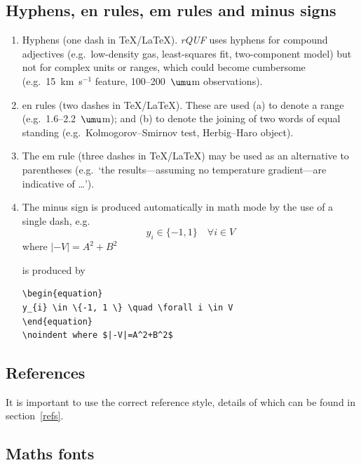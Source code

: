 \documentclass{rQUF2e}
\theoremstyle{plain}
\theoremstyle{definition}
\theoremstyle{remark}
\begin{document}
\subsection{Hyphens, en rules, em rules and minus signs}\label{dashes}

\begin{enumerate}
\item[(i)] Hyphens (one dash in \TeX/\LaTeX). {\it rQUF} uses hyphens
for compound adjectives (e.g.\ low-density gas, least-squares fit,
two-component  model) but not for complex  units  or ranges, which
could become cumbersome (e.g.\ 15~km~s$^{-1}$  feature,
100--200~$\umu$m observations).

\item[(ii)] en rules (two dashes in \TeX/\LaTeX). These are used  (a) to denote a range (e.g.\ 1.6--2.2~$\umu$m);
and (b) to denote the joining of two words of equal standing (e.g.\ Kolmogorov--Smirnov test, Herbig--Haro object).

\item[(iii)] The  em rule (three dashes in \TeX/\LaTeX) may be used as an alternative to parentheses (e.g.\ `the results---assuming no temperature gradient---are indicative of \ldots').

\item[(iv)] The minus sign is produced automatically in math mode by the use of a single dash, e.g.
\begin{equation}
y_{i} \in \{-1, 1 \} \quad \forall i \in V
\end{equation}
\noindent where $|-V|=A^2+B^2$\medskip

\noindent is produced by

\begin{verbatim}
\begin{equation}
y_{i} \in \{-1, 1 \} \quad \forall i \in V
\end{equation}
\noindent where $|-V|=A^2+B^2$
\end{verbatim}

\end{enumerate}


\subsection{References}

It is important to use the correct reference style, details  of
which can be found in section~\ref{refs}.


\subsection{Maths fonts}
\end{document}
